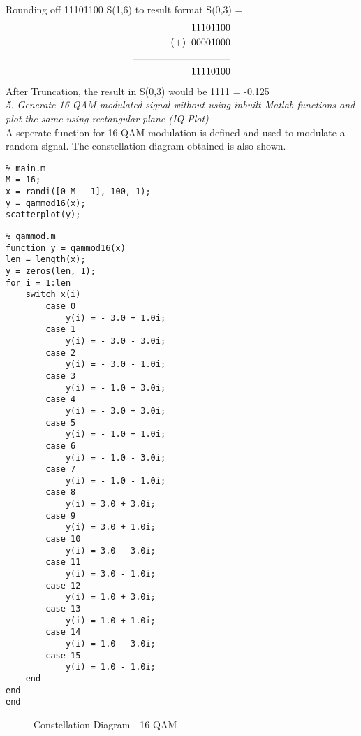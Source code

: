\documentclass[a4paper]{article}
\begin{document}
Rounding off 11101100 S(1,6) to result format S(0,3) =
\begin{align*} 
11101100\\
(+)  \;\;00001000\\
\rule{100pt}{0.1pt}\\
11110100\\
\end{align*}
After Truncation, the result in S(0,3) would be 1111 = -0.125\\
\bigskip
\textit{5. Generate 16-QAM modulated signal without using inbuilt Matlab functions and plot the same using rectangular plane (IQ-Plot)}\\
\bigskip
A seperate function for 16 QAM modulation is defined and used to modulate a random signal. The constellation diagram obtained is also shown.
\begin{verbatim}
% main.m
M = 16;
x = randi([0 M - 1], 100, 1);
y = qammod16(x);
scatterplot(y);
\end{verbatim}   
\newpage
\begin{verbatim}
% qammod.m
function y = qammod16(x)
len = length(x);
y = zeros(len, 1);
for i = 1:len
    switch x(i)
        case 0
            y(i) = - 3.0 + 1.0i;
        case 1
            y(i) = - 3.0 - 3.0i;
        case 2
            y(i) = - 3.0 - 1.0i;
        case 3
            y(i) = - 1.0 + 3.0i;
        case 4
            y(i) = - 3.0 + 3.0i;
        case 5
            y(i) = - 1.0 + 1.0i;
        case 6
            y(i) = - 1.0 - 3.0i;
        case 7
            y(i) = - 1.0 - 1.0i;
        case 8
            y(i) = 3.0 + 3.0i;
        case 9
            y(i) = 3.0 + 1.0i;
        case 10
            y(i) = 3.0 - 3.0i;
        case 11
            y(i) = 3.0 - 1.0i;
        case 12
            y(i) = 1.0 + 3.0i;
        case 13
            y(i) = 1.0 + 1.0i;
        case 14
            y(i) = 1.0 - 3.0i;
        case 15
            y(i) = 1.0 - 1.0i;
    end
end
end
\end{verbatim}
\newpage
\begin{figure}[htbp]
  \centering
  
  \caption{Constellation Diagram - 16 QAM}
\end{figure}
\end{document}
